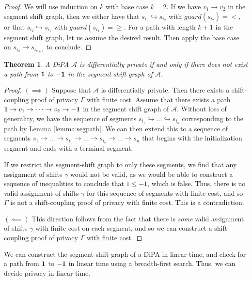 \documentclass{article}
\newtheorem{theorem}{Theorem}
\newcommand{\1}{\langle 1 \rangle}
\newcommand{\2}{\langle 2 \rangle}
\begin{document}
\begin{proof}
    We will use induction on $k$ with base case $k = 2$. If we have $v_1 \to v_2$ in the segment shift graph, then we either have that $s_{i_1} \hookrightarrow s_{i_2}$ with $guard(s_{i_2}) = <$, or that $s_{i_2} \hookrightarrow s_{i_1}$ with $guard(s_{i_2}) = \geq$. For a path with length $k + 1$ in the segment shift graph, let us assume the desired result. Then apply the base case on $s_{i_{k}} \to s_{i_{k + 1}}$ to conclude. 
\end{proof}

\begin{theorem}
    A DiPA $\mathcal{A}$ is differentially private if and only if there does not exist a path from $\bf 1$ to $\bf -1$ in the segment shift graph of $\mathcal{A}$.
\end{theorem}

\begin{proof}
    $(\implies)$ Suppose that $\mathcal{A}$ is differentially private. Then there exists a shift-coupling proof of privacy $\Gamma$ with finite cost. Assume that there exists a path ${\bf 1} \to v_1 \to \dots \to v_k \to {\bf -1}$ in the segment shift graph of $\mathcal{A}$. Without loss of generality, we have the sequence of segments $s_{i_1} \hookrightarrow \dots \hookrightarrow s_{i_k}$ corresponding to the path by Lemma \ref{lemma:segpath}. We can then extend this to a sequence of segments $s_1 \to \dots \to s_{i_1} \to \dots \to s_{i_k} \to \dots \to s_n$ that begins with the initialization segment and ends with a terminal segment. 

    If we restrict the segment-shift graph to only these segments, we find that any assignment of shifts $\gamma$ would not be valid, as we would be able to construct a sequence of inequalities to conclude that $1 \leq -1$, which is false. Thus, there is no valid assignment of shifts $\gamma$ for this sequence of segments with finite cost, and so $\Gamma$ is not a shift-coupling proof of privacy with finite cost. This is a contradiction.

    $(\impliedby)$ This direction follows from the fact that there is \textit{some} valid assignment of shifts $\gamma$ with finite cost on each segment, and so we can construct a shift-coupling proof of privacy $\Gamma$ with finite cost.
\end{proof}


We can construct the segment shift graph of a DiPA in linear time, and check for a path from $\bf 1$ to $\bf -1$ in linear time using a breadth-first search. Thus, we can decide privacy in linear time.
\end{document}
